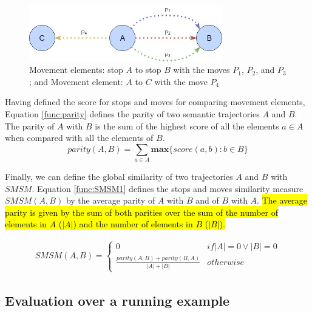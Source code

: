 \documentclass[12pt]{article}
\begin{document}
\begin{figure}[h]
\centering
\includegraphics[width=0.75\textwidth]{Images/Toy_trajectories.jpg}
\caption{\label{fig:move} Movement elements: stop $A$ to stop $B$ with the moves $P_1$, $P_2$, and $P_3$; and Movement element: $A$ to $C$ with the move $P_4$}
\end{figure}

Having defined the score for stops and moves for comparing movement elements, Equation \ref{func:parity} defines the parity of two semantic trajectories $A$ and $B$. The parity of $A$ with $B$ is the sum of the highest score of all the elements $a \in A$ when compared with all the elements of $B$.
\begin{equation}
\label{func:parity}
parity(A, B) = \sum\limits_{a\in A} \textbf{max}\{\textit{score}(a, b) : b \in B\}
\end{equation}

Finally, we can define the global similarity of two trajectories $A$ and $B$ with $SMSM$. Equation \ref{func:SMSM1} defines the stops and moves similarity measure $SMSM(A,B)$ by the average parity of $A$ with $B$ and of $B$ with $A$. \hl{The average parity is given by the sum of both parities over the sum of the number of elements in $A$ ($|A|$) and the number of elements in $B$ ($|B|$).}

\begin{equation}
\label{func:SMSM1}
\begin{split}
  SMSM(A, B) = 
  \begin{cases} 
      0 & if  |A| = 0 \vee |B| = 0 \\
      \frac{parity(A, B) + parity(B, A)}{|A| + |B|} & otherwise
  \end{cases}
\end{split}
\end{equation}



\subsection{Evaluation over a running example}
\end{document}

